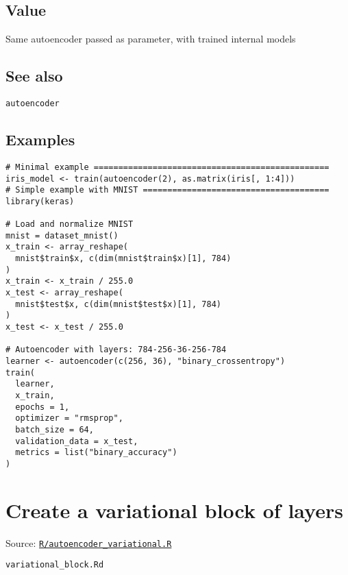 \hypertarget{value}{\subsection{\texorpdfstring{\protect\hyperlink{value}{}Value}{Value}}\label{value}}

Same autoencoder passed as parameter, with trained internal models

\hypertarget{see-also}{\subsection{\texorpdfstring{\protect\hyperlink{see-also}{}See
also}{See also}}\label{see-also}}

\texttt{autoencoder}

\hypertarget{examples}{\subsection{\texorpdfstring{\protect\hyperlink{examples}{}Examples}{Examples}}\label{examples}}

\begin{verbatim}
# Minimal example ================================================
iris_model <- train(autoencoder(2), as.matrix(iris[, 1:4]))
# Simple example with MNIST ======================================
library(keras)

# Load and normalize MNIST
mnist = dataset_mnist()
x_train <- array_reshape(
  mnist$train$x, c(dim(mnist$train$x)[1], 784)
)
x_train <- x_train / 255.0
x_test <- array_reshape(
  mnist$test$x, c(dim(mnist$test$x)[1], 784)
)
x_test <- x_test / 255.0

# Autoencoder with layers: 784-256-36-256-784
learner <- autoencoder(c(256, 36), "binary_crossentropy")
train(
  learner,
  x_train,
  epochs = 1,
  optimizer = "rmsprop",
  batch_size = 64,
  validation_data = x_test,
  metrics = list("binary_accuracy")
)
\end{verbatim}

\section{Create a variational block of
layers}\label{create-a-variational-block-of-layers}

Source:
\href{https://github.com/fdavidcl/ruta/blob/master/R/autoencoder_variational.R}{\texttt{R/autoencoder\_variational.R}}

\texttt{variational\_block.Rd}

